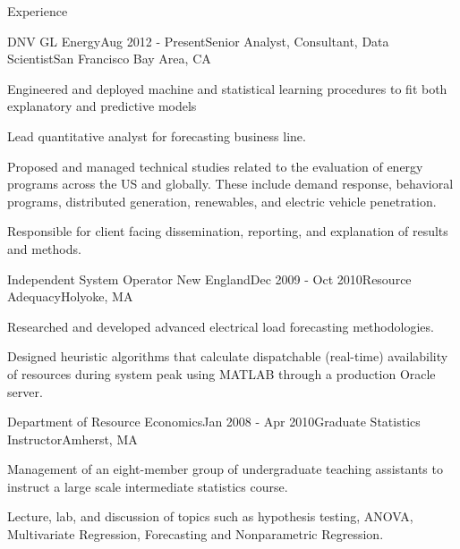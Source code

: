 \documentclass{resume} %
\begin{document}

	\begin{rSection}{Experience}

	\begin{rSubsection}{DNV GL Energy}{Aug 2012 - Present}{Senior Analyst, Consultant, Data Scientist}{San Francisco Bay Area, CA}
	\item Engineered and deployed machine and statistical learning procedures to fit both explanatory and predictive models
	\item Lead quantitative analyst for forecasting business line.
	\item Proposed and managed technical studies related to the evaluation of energy programs across the US and globally. These include demand response, behavioral programs, distributed generation, renewables, and electric vehicle  penetration. 
	\item Responsible for client facing dissemination, reporting, and explanation of results and methods. 
	
	\end{rSubsection}


	\begin{rSubsection}{Independent System Operator New England}{Dec 2009 - Oct 2010}{Resource Adequacy}{Holyoke, MA}
	\item Researched and developed advanced electrical load forecasting methodologies.
	\item Designed heuristic algorithms that calculate dispatchable (real-time) availability of resources during system peak using MATLAB through a production Oracle server.
	\end{rSubsection}


	\begin{rSubsection}{Department of Resource Economics}{Jan 2008 - Apr 2010}{Graduate Statistics Instructor}{Amherst, MA}
	\item Management of an eight-member group of undergraduate teaching assistants to instruct a large scale intermediate statistics course.
  \item Lecture, lab, and discussion of topics such as hypothesis testing, ANOVA, Multivariate Regression, Forecasting and Nonparametric Regression.
	\end{rSubsection}

	\end{rSection}
	
\end{document}
